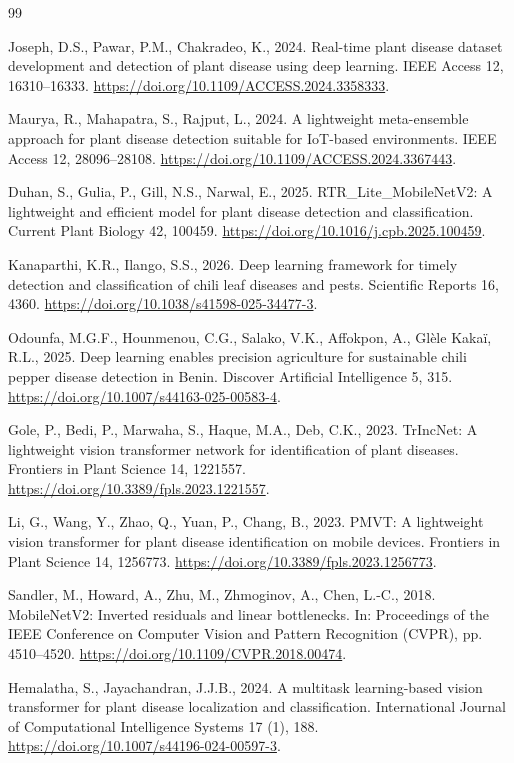 \begin{thebibliography}{99}

Joseph, D.S., Pawar, P.M., Chakradeo, K., 2024. Real-time plant disease dataset development and detection of plant disease using deep learning. IEEE Access 12, 16310--16333. \url{https://doi.org/10.1109/ACCESS.2024.3358333}.

Maurya, R., Mahapatra, S., Rajput, L., 2024. A lightweight meta-ensemble approach for plant disease detection suitable for IoT-based environments. IEEE Access 12, 28096--28108. \url{https://doi.org/10.1109/ACCESS.2024.3367443}.

Duhan, S., Gulia, P., Gill, N.S., Narwal, E., 2025. RTR\_Lite\_MobileNetV2: A lightweight and efficient model for plant disease detection and classification. Current Plant Biology 42, 100459. \url{https://doi.org/10.1016/j.cpb.2025.100459}.

Kanaparthi, K.R., Ilango, S.S., 2026. Deep learning framework for timely detection and classification of chili leaf diseases and pests. Scientific Reports 16, 4360. \url{https://doi.org/10.1038/s41598-025-34477-3}.

Odounfa, M.G.F., Hounmenou, C.G., Salako, V.K., Affokpon, A., Gl\`ele Kaka\"i, R.L., 2025. Deep learning enables precision agriculture for sustainable chili pepper disease detection in Benin. Discover Artificial Intelligence 5, 315. \url{https://doi.org/10.1007/s44163-025-00583-4}.

Gole, P., Bedi, P., Marwaha, S., Haque, M.A., Deb, C.K., 2023. TrIncNet: A lightweight vision transformer network for identification of plant diseases. Frontiers in Plant Science 14, 1221557. \url{https://doi.org/10.3389/fpls.2023.1221557}.

Li, G., Wang, Y., Zhao, Q., Yuan, P., Chang, B., 2023. PMVT: A lightweight vision transformer for plant disease identification on mobile devices. Frontiers in Plant Science 14, 1256773. \url{https://doi.org/10.3389/fpls.2023.1256773}.

Sandler, M., Howard, A., Zhu, M., Zhmoginov, A., Chen, L.-C., 2018. MobileNetV2: Inverted residuals and linear bottlenecks. In: Proceedings of the IEEE Conference on Computer Vision and Pattern Recognition (CVPR), pp. 4510--4520. \url{https://doi.org/10.1109/CVPR.2018.00474}.

Hemalatha, S., Jayachandran, J.J.B., 2024. A multitask learning-based vision transformer for plant disease localization and classification. International Journal of Computational Intelligence Systems 17 (1), 188. \url{https://doi.org/10.1007/s44196-024-00597-3}.


\end{thebibliography}
